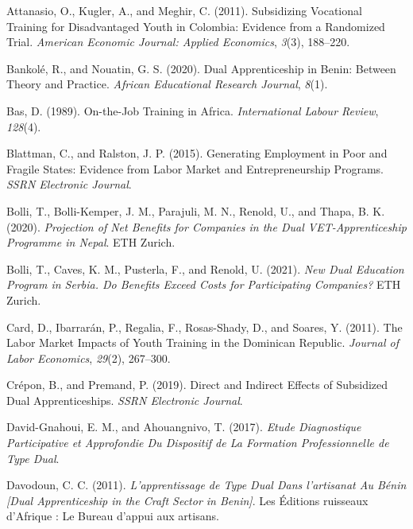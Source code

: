 \documentclass[
  11pt,
a4paper
]{report}
\newlength{\cslhangindent}
\newenvironment{CSLReferences}[2] %
 {%
  \setlength{\parindent}{0pt}
  \ifodd #1 \everypar{\setlength{\hangindent}{\cslhangindent}}\ignorespaces\fi
  \ifnum #2 > 0
  \setlength{\parskip}{#2\baselineskip}
  \fi
 }%
 {}
\begin{document}
\begin{CSLReferences}{1}{0}
\leavevmode{}%
Attanasio, O., Kugler, A., and Meghir, C. (2011). Subsidizing {Vocational Training} for {Disadvantaged Youth} in {Colombia}: {Evidence} from a {Randomized Trial}. \emph{American Economic Journal: Applied Economics}, \emph{3}(3), 188--220.

\leavevmode{}%
Bankolé, R., and Nouatin, G. S. (2020). Dual {Apprenticeship} in {Benin}: {Between Theory} and {Practice}. \emph{African Educational Research Journal}, \emph{8}(1).

\leavevmode{}%
Bas, D. (1989). On-the-{Job Training} in {Africa}. \emph{International Labour Review}, \emph{128}(4).

\leavevmode{}%
Blattman, C., and Ralston, J. P. (2015). Generating {Employment} in {Poor} and {Fragile States}: {Evidence} from {Labor Market} and {Entrepreneurship Programs}. \emph{SSRN Electronic Journal}.

\leavevmode{}%
Bolli, T., Bolli-Kemper, J. M., Parajuli, M. N., Renold, U., and Thapa, B. K. (2020). \emph{Projection of {Net Benefits} for {Companies} in the {Dual VET-Apprenticeship Programme} in {Nepal}}. {ETH Zurich}.

\leavevmode{}%
Bolli, T., Caves, K. M., Pusterla, F., and Renold, U. (2021). \emph{New {Dual Education Program} in {Serbia}. {Do Benefits Exceed Costs} for {Participating Companies}?} {ETH Zurich}.

\leavevmode{}%
Card, D., Ibarrarán, P., Regalia, F., Rosas-Shady, D., and Soares, Y. (2011). The {Labor Market Impacts} of {Youth Training} in the {Dominican Republic}. \emph{Journal of Labor Economics}, \emph{29}(2), 267--300.

\leavevmode{}%
Crépon, B., and Premand, P. (2019). Direct and {Indirect Effects} of {Subsidized Dual Apprenticeships}. \emph{SSRN Electronic Journal}.

\leavevmode{}%
David-Gnahoui, E. M., and Ahouangnivo, T. (2017). \emph{Etude {Diagnostique Participative} et {Approfondie Du Dispositif} de {La Formation Professionnelle} de {Type Dual}}.

\leavevmode{}%
Davodoun, C. C. (2011). \emph{L'apprentissage de {Type Dual Dans} l'artisanat {Au Bénin} {[}{Dual Apprenticeship} in the {Craft Sector} in {Benin}{]}}. {Les Éditions ruisseaux d'Afrique : Le Bureau d'appui aux artisans}.


\end{CSLReferences}
\end{document}
